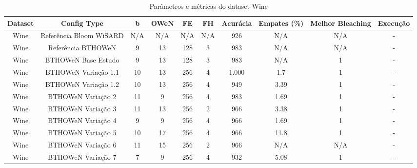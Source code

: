 \documentclass{article}
\begin{document}
\begin{longtable}{|c|c|c|c|c|c|c|c|c|c|}
\caption{Parâmetros e métricas do dataset Wine} \\
\hline
\textbf{Dataset} & \textbf{Config Type} & \textbf{b} & \textbf{OWeN} & \textbf{FE} & \textbf{FH} & \textbf{Acurácia} & \textbf{Empates (\%)} & \textbf{Melhor Bleaching} & \textbf{Execução} \\
\hline
Wine & Referência Bloom WiSARD & N/A & N/A & N/A & N/A & 926 & N/A & N/A & - \\
\hline
Wine & Referência BTHOWeN & 9 & 13 & 128 & 3 & 983 & N/A & N/A & - \\
\hline
Wine & BTHOWeN Base Estudo & 9 & 13 & 128 & 3 & 983 & N/A & 1 & - \\
\hline
Wine & BTHOWeN Variação 1.1 & 10 & 13 & 256 & 4 & 1.000 & 1.7 & 1 & - \\
\hline
Wine & BTHOWeN Variação 1.2 & 10 & 13 & 256 & 4 & 949 & 3.39 & 1 & - \\
\hline
Wine & BTHOWeN Variação 2 & 11 & 9 & 256 & 4 & 983 & 1.69 & 1 & - \\
\hline
Wine & BTHOWeN Variação 3 & 11 & 13 & 256 & 2 & 966 & 3.38 & 1 & - \\
\hline
Wine & BTHOWeN Variação 4 & 9 & 9 & 256 & 4 & 966 & 1.69 & 1 & - \\
\hline
Wine & BTHOWeN Variação 5 & 10 & 17 & 256 & 4 & 966 & 11.8 & 1 & - \\
\hline
Wine & BTHOWeN Variação 6 & 11 & 15 & 256 & 2 & 966 & N/A & N/A & - \\
\hline
Wine & BTHOWeN Variação 7 & 7 & 9 & 256 & 4 & 932 & 5.08 & 1 & - \\
\hline
\end{longtable}
\end{document}

